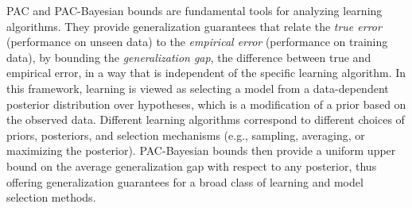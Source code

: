 \documentclass{article}
\begin{document}

PAC and PAC-Bayesian bounds are fundamental tools for analyzing learning algorithms. They provide generalization guarantees that relate the \emph{true error} (performance on unseen data) to the \emph{empirical error} (performance on training data), by bounding the \emph{generalization gap}, the difference between true and empirical error, in a way that is independent of the specific learning algorithm. In this framework, learning is viewed as selecting a model from a data-dependent posterior distribution over hypotheses, which is a modification of a prior based on the observed data. Different learning algorithms correspond to different choices of priors, posteriors, and selection mechanisms (e.g., sampling, averaging, or maximizing the posterior). PAC-Bayesian bounds then provide a uniform upper bound on the average generalization gap with respect to any posterior, thus offering generalization guarantees for a broad class of learning and model selection methods.
\end{document}
